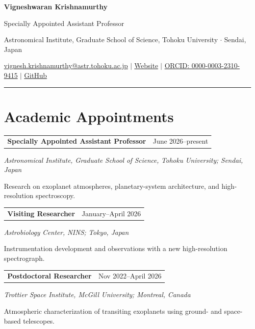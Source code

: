\documentclass[10pt,a4paper]{article}
\makeatletter
\newcommand{\grantheading}[2]{%
\begin{tabularx}{\textwidth}{
    @{}
    >{\raggedright\arraybackslash}X
    >{\raggedleft\arraybackslash}p{4.5cm}
    @{}
}
\textbf{#1} & #2
\end{tabularx}
}
\makeatother
\begin{document}
\thispagestyle{empty}
{\fontsize{25}{28}\selectfont\sffamily\bfseries\color{navy} Vigneshwaran Krishnamurthy}\par
\vspace{2pt}
{\large\sffamily\color{teal}Specially Appointed Assistant Professor}\par
{\small Astronomical Institute, Graduate School of Science, Tohoku University $\cdot$ Sendai, Japan}\par
\vspace{4pt}
{\small\sffamily
\href{mailto:vignesh.krishnamurthy@astr.tohoku.ac.jp}{vignesh.krishnamurthy@astr.tohoku.ac.jp}
\quad$\vert$\quad
\href{https://vigneshastro.github.io/}{Website}
\quad$\vert$\quad
\href{https://orcid.org/0000-0003-2310-9415}{ORCID: 0000-0003-2310-9415}
\quad$\vert$\quad
\href{https://github.com/VigneshAstro}{GitHub}}
\vspace{5pt}
\color{rulegray}\hrule\color{black}
\vspace{2pt}
\section{Academic Appointments}

\grantheading
{Specially Appointed Assistant Professor}
{June 2026--present}
\emph{Astronomical Institute, Graduate School of Science,
Tohoku University; Sendai, Japan}

{\color{entrylight}
\vspace{-1.0mm}Research on exoplanet atmospheres, planetary-system architecture,
and high-resolution spectroscopy.
\par}


\grantheading
{Visiting Researcher}
{January--April 2026}
\emph{Astrobiology Center, NINS;
Tokyo, Japan}

{\color{entrylight}
\vspace{-1.0mm}Instrumentation development and observations with a new
high-resolution spectrograph.
\par}


\grantheading
{Postdoctoral Researcher}
{Nov 2022--April 2026}
\emph{Trottier Space Institute, McGill University;
Montreal, Canada}

{\color{entrylight}
\vspace{-1.0mm}Atmospheric characterization of transiting exoplanets using
ground- and space-based telescopes.
\par}
\end{document}
